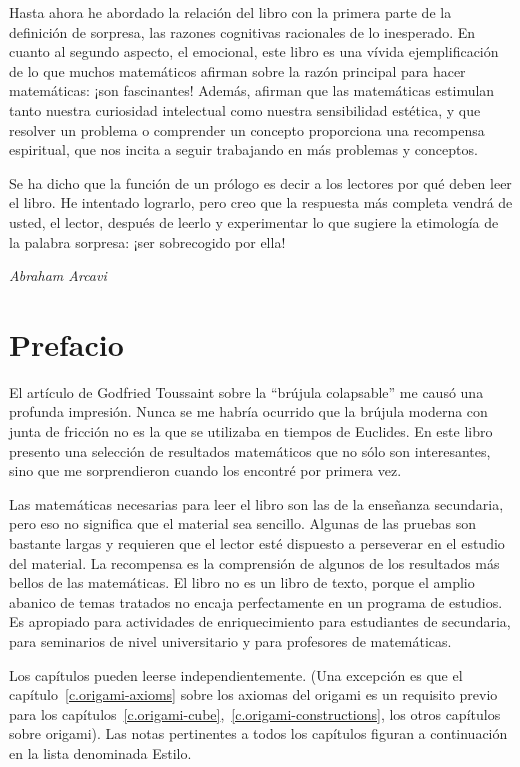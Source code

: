 Hasta ahora he abordado la relación del libro con la primera parte de la definición de sorpresa, las razones cognitivas racionales de lo inesperado. En cuanto al segundo aspecto, el emocional, este libro es una vívida ejemplificación de lo que muchos matemáticos afirman sobre la razón principal para hacer matemáticas: ¡son fascinantes! Además, afirman que las matemáticas estimulan tanto nuestra curiosidad intelectual como nuestra sensibilidad estética, y que resolver un problema o comprender un concepto proporciona una recompensa espiritual, que nos incita a seguir trabajando en más problemas y conceptos. 

Se ha dicho que la función de un prólogo es decir a los lectores por qué deben leer el libro. He intentado lograrlo, pero creo que la respuesta más completa vendrá de usted, el lector, después de leerlo y experimentar lo que sugiere la etimología de la palabra sorpresa: ¡ser sobrecogido por ella!

\bigskip

\begin{flushright}
\textit{Abraham Arcavi}
\end{flushright}

\chapter*{Prefacio}

El artículo de Godfried Toussaint sobre la ``brújula colapsable'' \cite{toussaint} me causó una profunda impresión. Nunca se me habría ocurrido que la brújula moderna con junta de fricción no es la que se utilizaba en tiempos de Euclides. En este libro presento una selección de resultados matemáticos que no sólo son interesantes, sino que me sorprendieron cuando los encontré por primera vez.

Las matemáticas necesarias para leer el libro son las de la enseñanza secundaria, pero eso no significa que el material sea sencillo. Algunas de las pruebas son bastante largas y requieren que el lector esté dispuesto a perseverar en el estudio del material. La recompensa es la comprensión de algunos de los resultados más bellos de las matemáticas. El libro no es un libro de texto, porque el amplio abanico de temas tratados no encaja perfectamente en un programa de estudios. Es apropiado para actividades de enriquecimiento para estudiantes de secundaria, para seminarios de nivel universitario y para profesores de matemáticas.

Los capítulos pueden leerse independientemente. (Una excepción es que el capítulo~\ref{c.origami-axioms} sobre los axiomas del origami es un requisito previo para los capítulos~\ref{c.origami-cube},~\ref{c.origami-constructions}, los otros capítulos sobre origami). Las notas pertinentes a todos los capítulos figuran a continuación en la lista denominada Estilo.

